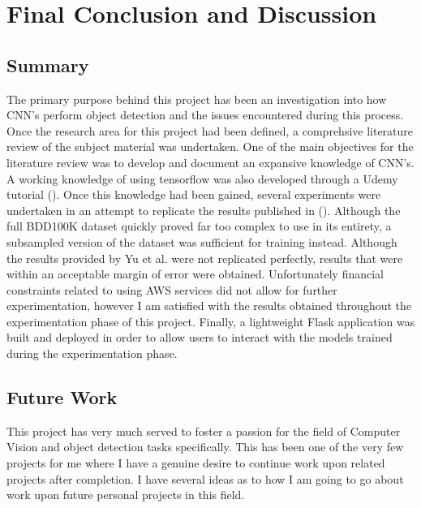 \documentclass[12pt]{report}
\begin{document}
\newpage
\chapter{Final Conclusion and Discussion}
\section{Summary}
\begin{flushleft}
The primary purpose behind this project has been an investigation into how CNN's perform object detection and the issues encountered during this process. Once the research area for this project had been defined, a comprehsive literature review of the subject material was undertaken. One of the main objectives for the literature review was to develop and document an expansive knowledge of CNN's. A working knowledge of using tensorflow was also developed through a Udemy tutorial (\cite{udemy}). Once this knowledge had been gained, several experiments were undertaken in an attempt to replicate the results published in (\cite{yu2018bdd100k}). Although the full BDD100K dataset quickly proved far too complex to use in its entirety, a subsampled version of the dataset was sufficient for training instead. Although the results provided by Yu et al. were not replicated perfectly, results that were within an acceptable margin of error were obtained. Unfortunately financial constraints related to using AWS services did not allow for further experimentation, however I am satisfied with the results obtained throughout the experimentation phase of this project. Finally, a lightweight Flask application was built and deployed in order to allow users to interact with the models trained during the experimentation phase.
\end{flushleft}

\section{Future Work}
\begin{flushleft}
This project has very much served to foster a passion for the field of Computer Vision and object detection tasks specifically. This has been one of the very few projects for me where I have a genuine desire to continue work upon related projects after completion. I have several ideas as to how I am going to go about work upon future personal projects in this field.
\end{flushleft}
\end{document}
